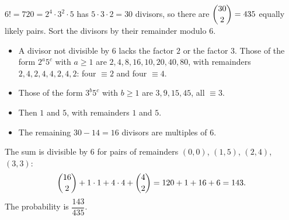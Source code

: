 $6!=720=2^4\cdot3^2\cdot5$ has $5\cdot3\cdot2=30$ divisors, so there are $\dbinom{30}{2}=435$ equally likely pairs. Sort the divisors by their remainder modulo $6$.
\begin{itemize}
\item A divisor not divisible by $6$ lacks the factor $2$ or the factor $3$. Those of the form $2^a5^c$ with $a\ge1$ are $2,4,8,16,10,20,40,80$, with remainders $2,4,2,4,4,2,4,2$: four $\equiv2$ and four $\equiv4$.
\item Those of the form $3^b5^c$ with $b\ge1$ are $3,9,15,45$, all $\equiv3$.
\item Then $1$ and $5$, with remainders $1$ and $5$.
\item The remaining $30-14=16$ divisors are multiples of $6$.
\end{itemize}
The sum is divisible by $6$ for pairs of remainders $(0,0)$, $(1,5)$, $(2,4)$, $(3,3)$:
\[
\dbinom{16}{2}+1\cdot1+4\cdot4+\dbinom42=120+1+16+6=143 .
\]
The probability is $\boxed{\dfrac{143}{435}}$.

